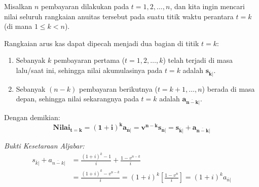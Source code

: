 \documentclass[11pt,a4paper]{article}
\begin{document}
Misalkan $n$ pembayaran dilakukan pada $t = 1, 2, \dots, n$, dan kita ingin mencari nilai seluruh rangkaian anuitas tersebut pada suatu titik waktu perantara $t = k$ (di mana $1 \le k < n$).

\begin{center}
\end{center}

Rangkaian arus kas dapat dipecah menjadi dua bagian di titik $t = k$:
\begin{enumerate}
    \item Sebanyak $k$ pembayaran pertama ($t = 1, 2, \dots, k$) telah terjadi di masa lalu/saat ini, sehingga nilai akumulasinya pada $t = k$ adalah $\mathbf{s_{\overline{k}|}}$.
    \item Sebanyak $(n - k)$ pembayaran berikutnya ($t = k+1, \dots, n$) berada di masa depan, sehingga nilai sekarangnya pada $t = k$ adalah $\mathbf{a_{\overline{n-k}|}}$.
\end{enumerate}

Dengan demikian:
\begin{equation}
    \mathbf{\text{Nilai}_{t=k} = (1+i)^k a_{\overline{n}|} = v^{n-k} s_{\overline{n}|} = s_{\overline{k}|} + a_{\overline{n-k}|}}
\end{equation}

\textit{Bukti Kesetaraan Aljabar:}
\begin{align*}
    s_{\overline{k}|} + a_{\overline{n-k}|} &= \frac{(1+i)^k - 1}{i} + \frac{1 - v^{n-k}}{i} \\
    &= \frac{(1+i)^k - v^{n-k}}{i} = (1+i)^k \left[ \frac{1 - v^n}{i} \right] = (1+i)^k a_{\overline{n}|}
\end{align*}
\end{document}
